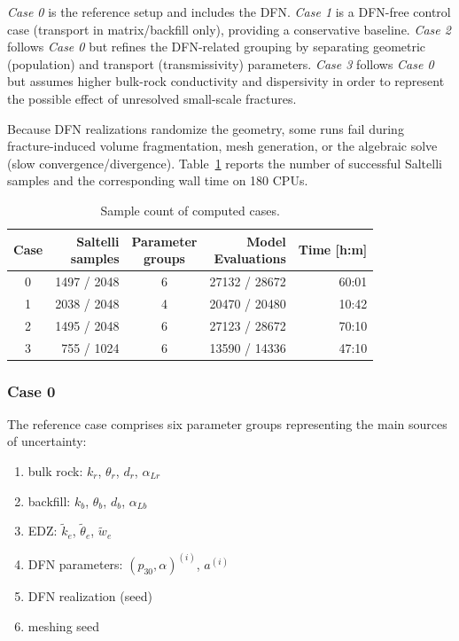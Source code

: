 \emph{Case 0} is the reference setup and includes the DFN. 
\emph{Case 1} is a DFN-free control case (transport in matrix/backfill only), providing a conservative baseline. 
\emph{Case 2} follows \emph{Case 0} but refines the DFN-related grouping by separating geometric (population) and transport (transmissivity) parameters.
\emph{Case 3} follows \emph{Case 0} but assumes higher bulk-rock conductivity and dispersivity in order to represent the possible effect of unresolved small-scale fractures.

Because DFN realizations randomize the geometry, some runs fail during fracture-induced volume fragmentation, mesh generation, or the algebraic solve (slow convergence/divergence). Table~\ref{tab:sample_counts} reports the number of successful Saltelli samples and the corresponding wall time on 180 CPUs.

\begin{table}[ht]
    \caption{Sample count of computed cases.}
    \label{tab:sample_counts}
    \centering
    \footnotesize
    \renewcommand{\arraystretch}{1.25}
    \begin{tabular}{crcrr}
    \toprule
    Case & \makecell[c]{Saltelli\\ samples} & \makecell[c]{Parameter\\ groups} & \makecell[c]{Model\\ Evaluations} & Time [h:m] \\
    \midrule
    0 & 1497 / 2048 & 6 & 27132 / 28672 & 60:01\\
    1 & 2038 / 2048 & 4 & 20470 / 20480 & 10:42\\
    2 & 1495 / 2048 & 6 & 27123 / 28672 & 70:10\\
    3 & 755 / 1024 & 6 & 13590 / 14336 & 47:10\\
    \bottomrule
    \end{tabular}
\end{table}


\FloatBarrier
\subsubsection{Case 0}
The reference case comprises six parameter groups representing the main sources of uncertainty:
\begin{enumerate}
    \item bulk rock: $k_r$, $\theta_r$, $d_r$, $\alpha_{Lr}$
    \item backfill: $k_b$, $\theta_b$, $d_b$, $\alpha_{Lb}$
    \item EDZ: $\tilde k_e$, $\tilde \theta_e$, $\tilde w_e$
    \item DFN parameters: $(p_{30}, \alpha)^{(i)}$, $a^{(i)}$
    \item DFN realization (seed)
    \item meshing seed
\end{enumerate}


